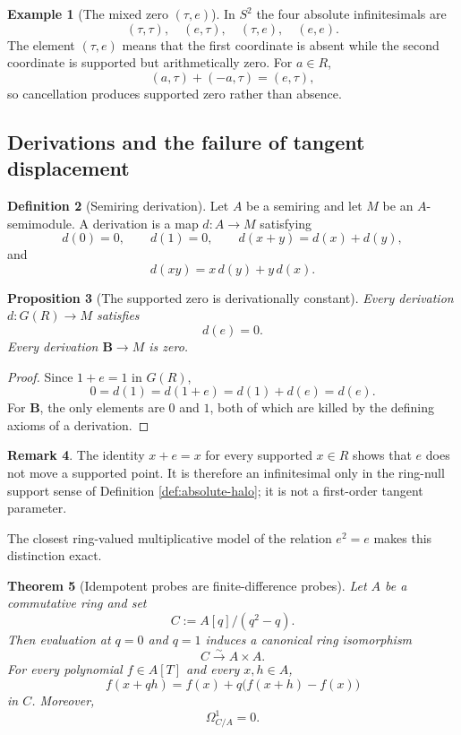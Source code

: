 \documentclass[11pt]{amsart}
\numberwithin{equation}{section}
\newtheorem{theorem}{Theorem}[section]
\newtheorem{proposition}[theorem]{Proposition}
\theoremstyle{definition}
\newtheorem{definition}[theorem]{Definition}
\newtheorem{example}[theorem]{Example}
\newtheorem{remark}[theorem]{Remark}
\newcommand{\B}{\mathbf B}
\begin{document}
\begin{example}[The mixed zero $(\tau,e)$]
In $S^2$ the four absolute infinitesimals are
\[
(\tau,\tau),
\quad
(e,\tau),
\quad
(\tau,e),
\quad
(e,e).
\]
The element $(\tau,e)$ means that the first coordinate is absent while the second coordinate is supported but arithmetically zero.  For $a\in R$,
\[
(a,\tau)+(-a,\tau)=(e,\tau),
\]
so cancellation produces supported zero rather than absence.
\end{example}

\subsection{Derivations and the failure of tangent displacement}

\begin{definition}[Semiring derivation]
Let $A$ be a semiring and let $M$ be an $A$-semimodule.  A derivation is a map $d:A\to M$ satisfying
\[
d(0)=0,
\qquad
d(1)=0,
\qquad
d(x+y)=d(x)+d(y),
\]
and
\[
d(xy)=x\,d(y)+y\,d(x).
\]
\end{definition}

\begin{proposition}[The supported zero is derivationally constant]\label{prop:derivation-kills-e}
Every derivation $d:G(R)\to M$ satisfies
\[
d(e)=0.
\]
Every derivation $\B\to M$ is zero.
\end{proposition}

\begin{proof}
Since $1+e=1$ in $G(R)$,
\[
0=d(1)=d(1+e)=d(1)+d(e)=d(e).
\]
For $\B$, the only elements are $0$ and $1$, both of which are killed by the defining axioms of a derivation.
\end{proof}

\begin{remark}
The identity $x+e=x$ for every supported $x\in R$ shows that $e$ does not move a supported point.  It is therefore an infinitesimal only in the ring-null support sense of Definition \ref{def:absolute-halo}; it is not a first-order tangent parameter.
\end{remark}

The closest ring-valued multiplicative model of the relation $e^2=e$ makes this distinction exact.

\begin{theorem}[Idempotent probes are finite-difference probes]\label{thm:idempotent-probe}
Let $A$ be a commutative ring and set
\[
C:=A[q]/(q^2-q).
\]
Then evaluation at $q=0$ and $q=1$ induces a canonical ring isomorphism
\[
C\xrightarrow{\sim}A\times A.
\]
For every polynomial $f\in A[T]$ and every $x,h\in A$,
\[
f(x+qh)
=
f(x)+q\bigl(f(x+h)-f(x)\bigr)
\]
in $C$.  Moreover,
\[
\Omega^1_{C/A}=0.
\]
\end{theorem}
\end{document}

